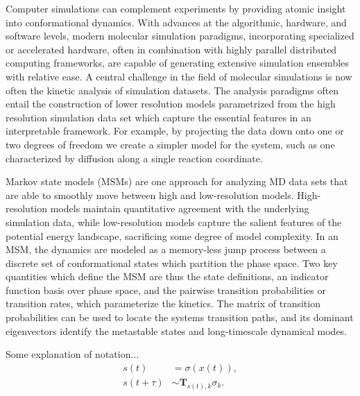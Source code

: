 \documentclass[journal=jpcbfk, layout=traditional, manuscript=article]{achemso}
\begin{document}
Computer simulations can complement experiments by providing atomic insight into conformational dynamics. With advances at the algorithmic, hardware, and software levels, modern molecular simulation paradigms, incorporating specialized or accelerated hardware, often in combination with highly parallel distributed computing frameworks, are capable of generating extensive simulation ensembles with relative ease\cite{Gotz2012Routine, Eastman2013OpenMM, Shirts2000Screen, Shaw2009Millisecond, Hess2008PLINCS, Buch2010High}. A central challenge in the field of molecular simulations is now often the kinetic analysis of simulation datasets. The analysis paradigms often entail the construction of lower resolution models parametrized from the high resolution simulation data set which capture the essential features in an interpretable framework\cite{Freddolino2010Challenges, Lane2013Milliseconds}. For example, by projecting the data down onto one or two degrees of freedom we create a simpler model for the system, such as one characterized by diffusion along a single reaction coordinate\cite{Best2010Coordinate}.

Markov state models (MSMs) are one approach for analyzing MD data sets that are able to smoothly move between high and low-resolution models\cite{Chodera2007Automatic, Prinz2011Markov, Beauchamp2012Simple, Bowman2013Quantitative}. High-resolution  models maintain quantitative agreement with the underlying simulation data, while low-resolution models capture the salient features of the potential energy landscape, sacrificing some degree of model complexity. In an MSM, the dynamics are modeled as a memory-less jump process between a discrete set of conformational states which partition the phase space. Two key quantities which define the MSM are thus the state definitions, an indicator function basis over phase space, and the pairwise transition probabilities or transition rates, which parameterize the kinetics. The matrix of transition probabilities can be used to locate the systems transition paths\cite{Weinan2006Towards}, and its dominant eigenvectors identify the metastable states\cite{Deuflhard2000Identification} and long-timescale dynamical modes\cite{}.

Some explanation of notation...
\begin{align}
s(t) &= \sigma(x(t)), \\
s(t+\tau) &\sim \mathbf{T}_{s(t), k} \sigma_k.
\end{align}
\end{document}
